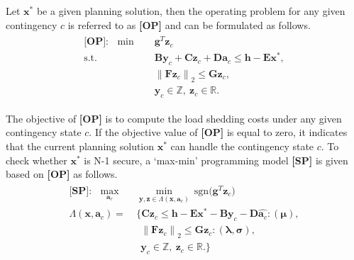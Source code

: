 \documentclass[a4paper,fleqn]{cas-dc}
\begin{document}
Let $ \boldsymbol{x}^{*} $ be a given planning solution, then the operating
problem for any given contingency $ c $ is referred to as \textbf{[OP]} and 
can be formulated as follows.
\begin{align}
    \label{OP}
    \begin{aligned}
        \textbf{[OP]}: \ \ \min \quad &
        \boldsymbol{g}^{T} \boldsymbol{z}_{c} 
        \\ \text{s.t.} \quad & 
        \boldsymbol{B} \boldsymbol{y}_{c} + 
        \boldsymbol{C} \boldsymbol{z}_{c} + 
        \boldsymbol{D} \boldsymbol{a}_{c} \leq 
        \boldsymbol{h} - \boldsymbol{E} \boldsymbol{x}^{*}, 
        \\ & 
        \left\| \boldsymbol{F} \boldsymbol{z}_{c} \right\|_{2} \leq 
        \boldsymbol{G} \boldsymbol{z}_{c}, 
        \\ & 
        \boldsymbol{y}_{c} \in \mathbb{Z}, \
        \boldsymbol{z}_{c} \in \mathbb{R}.
    \end{aligned}
\end{align}

The objective of \textbf{[OP]} is to compute the load shedding costs under 
any given contingency state $ c $. If the objective value of \textbf{[OP]} is 
equal to zero, it indicates that the current planning solution 
$ \boldsymbol{x}^{*} $ can handle the contingency state $ c $. To check 
whether $ \boldsymbol{x}^{*} $ is N-1 secure, a `max-min' programming model 
\textbf{[SP]} is given based on \textbf{[OP]} as follows.
\begin{align}
    \label{SP}
    \begin{aligned}
        \textbf{[SP]}: \ \
        \max_{\boldsymbol{a}_{c}} & \min_{\boldsymbol{y}, \boldsymbol{z} \in 
        \Lambda(\boldsymbol{x}, \boldsymbol{a}_{c})} \ 
        \mathrm{sgn} \bigl(
        \boldsymbol{g}^{T} \boldsymbol{z}_{c} \bigr) \\
        \Lambda(\boldsymbol{x}, \boldsymbol{a}_{c}) = \ 
        & \{ \boldsymbol{C} \boldsymbol{z}_{c} \leq 
        \boldsymbol{h} - \boldsymbol{E} \boldsymbol{x}^{*} - 
        \boldsymbol{B} \boldsymbol{y}_{c} - 
        \boldsymbol{D} \widehat{\boldsymbol{a}_{c}}
        : (\boldsymbol{\mu}), \\
        & \ \ \left\| \boldsymbol{F} \boldsymbol{z}_{c} \right\|_{2} \leq 
        \boldsymbol{G} \boldsymbol{z}_{c} 
        : (\boldsymbol{\lambda}, \boldsymbol{\sigma}), \\
        & \ \ \boldsymbol{y}_{c} \in \mathbb{Z}, \
        \boldsymbol{z}_{c} \in \mathbb{R}. \}
    \end{aligned}
\end{align}
\end{document}
